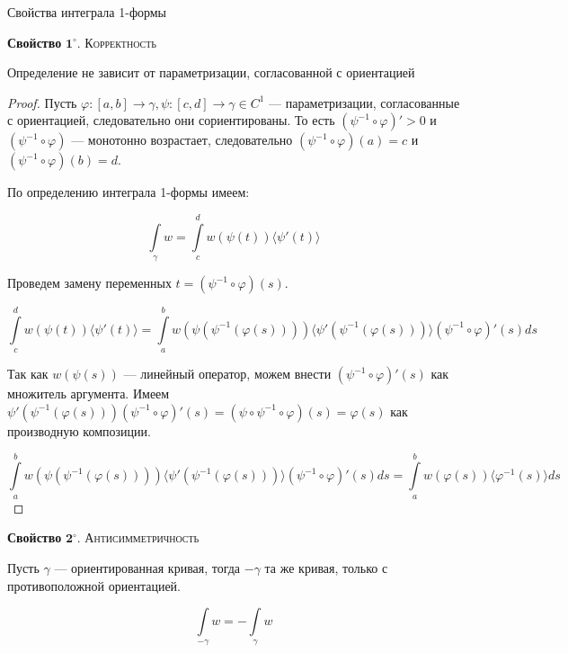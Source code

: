 \documentclass[a5paper]{article}
\theoremstyle{plain}
\theoremstyle{definition}
\numberwithin{through}{section}
\numberwithin{equation}{section}
\begin{document}
Свойства интеграла 1-формы


	{\bf Свойство} $\mathbf{1^\circ.}$
	{\textsc{Корректность}}
	
	Определение не зависит от параметризации, согласованной с ориентацией
	
	\begin{proof}
		Пусть $\varphi : [a, b] \to \gamma, \psi : [c, d] \to \gamma \in C^1$ --- параметризации, согласованные с ориентацией, следовательно они сориентированы. То есть  $(\psi^{-1} \circ \varphi)' > 0$ и $(\psi^{-1} \circ \varphi)$ --- монотонно возрастает, следовательно $(\psi^{-1} \circ \varphi)(a) = c$ и $(\psi^{-1} \circ \varphi)(b) = d$.
		
		По определению интеграла 1-формы имеем:
		
		\begin{equation*}
			\int\limits_{\gamma} w = \int\limits_{c}^{d} w(\psi(t)) \langle \psi'(t) \rangle 
		\end{equation*}
		
		Проведем замену переменных $t = (\psi^{-1} \circ \varphi)(s)$.
		
		\begin{equation*}
			\int\limits_{c}^{d} w(\psi(t)) \langle \psi'(t) \rangle = \int\limits_{a}^{b} w(\psi(\psi^{-1}(\varphi(s)))) \langle \psi'(\psi^{-1}(\varphi(s))) \rangle (\psi^{-1} \circ \varphi)'(s) ds
		\end{equation*}
		
		Так как $w(\psi(s))$ --- линейный оператор, можем внести $(\psi^{-1} \circ \varphi)'(s)$ как множитель аргумента. Имеем $\psi'(\psi^{-1}(\varphi(s)))(\psi^{-1} \circ \varphi)'(s) = (\psi \circ \psi^{-1} \circ \varphi)(s)= \varphi(s)$ как производную композиции.
		
		\begin{equation*}
			 \int\limits_{a}^{b} w(\psi(\psi^{-1}(\varphi(s)))) \langle \psi'(\psi^{-1}(\varphi(s))) \rangle (\psi^{-1} \circ \varphi)'(s) ds = \int\limits_{a}^{b} w(\varphi(s)) \langle \varphi^{-1}(s) \rangle ds
		\end{equation*} 
	\end{proof}

	{\bf Свойство} $\mathbf{2^\circ.}$
	{\textsc{Антисимметричность}}
	
	Пусть $\gamma$ --- ориентированная кривая, тогда $-\gamma$ та же кривая, только с противоположной ориентацией. 
	
	\begin{equation*}
		\int\limits_{-\gamma} w = -\int\limits_{\gamma} w
	\end{equation*}
	
\end{document}
